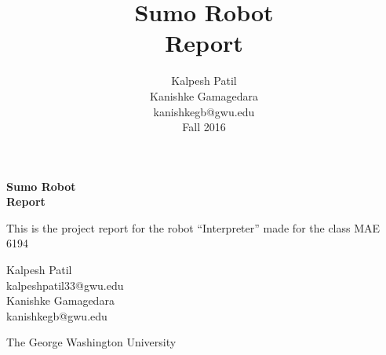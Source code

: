 \thispagestyle{empty}

\begin{center}


\vspace*{.5cm}

\title{ \bfseries Sumo Robot \\ Report}
\author{Kalpesh Patil \\ Kanishke Gamagedara\\ {\normalsize kanishkegb@gwu.edu}\\{\normalsize Fall 2016}}

\vspace{10 mm}
 {\bf \color{MidnightBlue} {\Huge Sumo Robot }\\ \vspace{4mm} \hline  \vspace{4mm} {\Huge Report}}\\

\vspace*{6cm}

{\large This is the project report for the robot ``Interpreter'' made for the class MAE 6194 }

\vspace*{5cm}

{\large Kalpesh Patil \\ {\normalsize kalpeshpatil33@gwu.edu }\\ \vspace*{5mm} Kanishke Gamagedara}\\ 
{\normalsize kanishkegb@gwu.edu}\\\vspace*{5mm}{\large Spring 2017}

\vspace*{3cm}

{\LARGE 
The George Washington University}

\end{center}